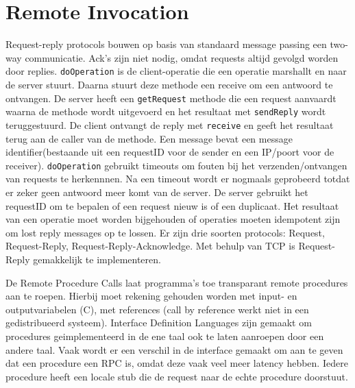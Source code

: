 \documentclass[../samenvatting.tex]{subfiles}
\begin{document}
\chapter{Remote Invocation}

Request-reply protocols bouwen op basis van standaard message passing een two-way communicatie.  Ack's zijn niet nodig, omdat requests altijd gevolgd worden door replies. \texttt{doOperation} is de client-operatie die een operatie marshallt en naar de server stuurt. Daarna stuurt deze methode een receive om een antwoord te ontvangen. De server heeft een \texttt{getRequest} methode die een request aanvaardt waarna de methode wordt uitgevoerd en het resultaat met \texttt{sendReply} wordt teruggestuurd. De client ontvangt de reply met \texttt{receive} en geeft het resultaat terug aan de caller van de methode. Een message bevat een message identifier(bestaande uit een requestID voor de sender en een IP/poort voor de receiver). \texttt{doOperation} gebruikt timeouts om fouten bij het verzenden/ontvangen van requests te herkennnen. Na een timeout wordt er nogmaals geprobeerd totdat er zeker geen antwoord meer komt van de server. De server gebruikt het requestID om te bepalen of een request nieuw is of een duplicaat. Het resultaat van een operatie moet worden bijgehouden of operaties moeten idempotent zijn om lost reply messages op te lossen. Er zijn drie soorten protocols: Request, Request-Reply, Request-Reply-Acknowledge. Met behulp van TCP is Request-Reply gemakkelijk te implementeren. 

De Remote Procedure Calls laat programma's toe transparant remote procedures aan te roepen. Hierbij moet rekening gehouden worden met input- en outputvariabelen (C), met references (call by reference werkt niet in een gedistribueerd systeem). Interface Definition Languages zijn gemaakt om procedures geimplementeerd in de ene taal ook te laten aanroepen door een andere taal. Vaak wordt er een verschil in de interface gemaakt om aan te geven dat een procedure een RPC is, omdat deze vaak veel meer latency hebben. Iedere procedure heeft een locale stub die de request naar de echte procedure doorstuut.
\end{document}

